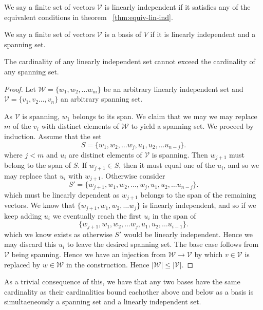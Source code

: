 \documentclass[]{article}
\begin{document}
\begin{defi} 
		We say a finite set of vectors $\mathcal{V}$ is linearly independent if it satisfies any of the equivalent conditions in theorem ~\ref{thm:equiv-lin-ind}.
\end{defi}

\begin{defi} [Basis]
		We say a finite set of vectors $\mathcal{V}$ is a basis of $V$ if it is linearly independent and a spanning set.
\end{defi}

\begin{thm}
	The cardinality of any linearly independent set cannot exceed the cardinality of any spanning set.
\end{thm}

\begin{proof}
		Let $\mathcal{W} = \{w_1, w_2, \ldots w_m\}$ be an arbitrary linearly independent set and $\mathcal{V} = \{v_1, v_2 \ldots, v_n\}$ an arbitrary spanning set.
		
		As $\mathcal{V}$ is spanning, $w_1$ belongs to its span. We claim that we may we may replace $m$ of the $v_i$ with distinct elements of $\mathcal{W}$ to yield a spanning set. We proceed by induction. Assume that the set 
		\[
		S = \{w_1, w_2, \ldots w_j, u_1, u_2, \ldots u_{n-j}\}
		.\] 
		where $j < m$ and $u_i$ are distinct elements of $\mathcal{V}$ is spanning. Then $w_{j+1}$ must belong to the span of $S$. If $w_{j+1} \in S$, then it must equal one of the $u_i$, and so we may replace that $u_i$ with $w_{j+1}$. Otherwise consider 
		\[
		S' = \{w_{j+1}, w_1, w_2, \ldots, w_j, u_1, u_2, \ldots u_{n-j}\} 
		.\] 
		which must be linearly dependent as $w_{j+1}$ belongs to the span of the remaining vectors. We know that $\{w_{j+1}, w_1, w_2, \ldots w_j\}$ is linearly independent, and so if we keep adding $u_i$ we eventually reach the first $u_i$ in the span of 
		\[
		\{w_{j+1}, w_1, w_2, \ldots w_j, u_1, u_2, \ldots u_{i-1}\}
		.\] 
	which we know exists as otherwise $S'$ would be linearly independent. Hence we may discard this $u_i$ to leave the desired spanning set. The base case follows from $\mathcal{V}$ being spanning. Hence we have an injection from $\mathcal{W} \to \mathcal{V}$ by which $v \in \mathcal{V}$ is replaced by $w \in \mathcal{W}$ in the construction. Hence $|\mathcal{W}| \leq |\mathcal{V}|$.
\end{proof}

As a trivial consequence of this, we have that any two bases have the same cardinality as their cardinalities bound eachother above and below as a basis is simultaeneously a spanning set and a linearly independent set. 
\end{document}
